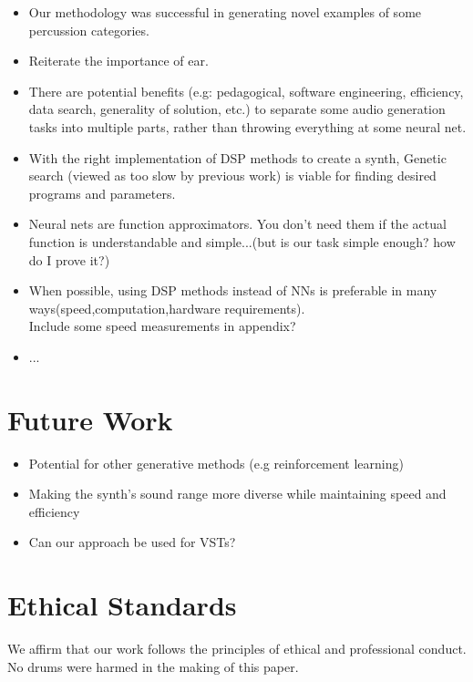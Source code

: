 \documentclass{nime-alternate} %
\begin{document}
\begin{itemize}
    \item Our methodology was successful in generating novel examples of some percussion categories.
    \item Reiterate the importance of ear.
    \item There are potential benefits (e.g: pedagogical, software engineering, efficiency, data search, generality of solution, etc.) to separate some audio generation tasks into multiple parts, rather than throwing everything at some neural net. 
    \item With the right implementation of DSP methods to create a synth, Genetic search (viewed as too slow by previous work) is viable for finding  desired programs and parameters.
    \item Neural nets are function approximators. You don't need them if the actual function is understandable and simple...(but is our task simple enough? how do I prove it?)
    \item When possible, using DSP methods instead of NNs is preferable in many ways(speed,computation,hardware requirements).\\
    \colorbox{green!=30}{Include some speed measurements in appendix?}
    \item ...
\end{itemize}
\section{Future Work}
\begin{itemize}
    \item Potential for other generative methods (e.g reinforcement learning)
    \item Making the synth's sound range more diverse while maintaining speed and efficiency
    \item Can our approach be used for VSTs?
\end{itemize}

\section{Ethical Standards}
We affirm that our work follows the principles of ethical and professional conduct. No drums were harmed in the making of this paper.

     
\end{document}
